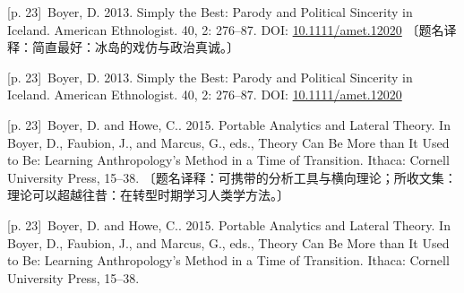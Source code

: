 \documentclass[10pt,a4paper]{article}
\begin{document}
\noindent\begin{minipage}{\textwidth}\begin{minipage}[t]{\dimexpr.5\textwidth-4mm\relax}\noindent\begin{minipage}[t]{\linewidth}{\scriptsize\color{gray} [p. 23]}\ Boyer, D. 2013. Simply the Best: Parody and Political Sincerity in Iceland. American Ethnologist. 40, 2: 276–87. DOI: \url{10.1111/amet.12020} 〔题名译释：简直最好：冰岛的戏仿与政治真诚。〕\par\end{minipage}\par\end{minipage}\hfill\begin{minipage}[t]{\dimexpr.5\textwidth-4mm\relax}\noindent\begin{minipage}[t]{\linewidth}{\scriptsize\color{gray} [p. 23]}\ Boyer, D. 2013. Simply the Best: Parody and Political Sincerity in Iceland. American Ethnologist. 40, 2: 276–87. DOI: \url{10.1111/amet.12020}\par\end{minipage}\par\end{minipage}\end{minipage}\par
\noindent\begin{minipage}{\textwidth}\begin{minipage}[t]{\dimexpr.5\textwidth-4mm\relax}\noindent\begin{minipage}[t]{\linewidth}{\scriptsize\color{gray} [p. 23]}\ Boyer, D. and Howe, C.. 2015. Portable Analytics and Lateral Theory. In Boyer, D., Faubion, J., and Marcus, G., eds., Theory Can Be More than It Used to Be: Learning Anthropology’s Method in a Time of Transition. Ithaca: Cornell University Press, 15–38. 〔题名译释：可携带的分析工具与横向理论；所收文集：理论可以超越往昔：在转型时期学习人类学方法。〕\par\end{minipage}\par\end{minipage}\hfill\begin{minipage}[t]{\dimexpr.5\textwidth-4mm\relax}\noindent\begin{minipage}[t]{\linewidth}{\scriptsize\color{gray} [p. 23]}\ Boyer, D. and Howe, C.. 2015. Portable Analytics and Lateral Theory. In Boyer, D., Faubion, J., and Marcus, G., eds., Theory Can Be More than It Used to Be: Learning Anthropology’s Method in a Time of Transition. Ithaca: Cornell University Press, 15–38.\par\end{minipage}\par\end{minipage}\end{minipage}\par
\end{document}

